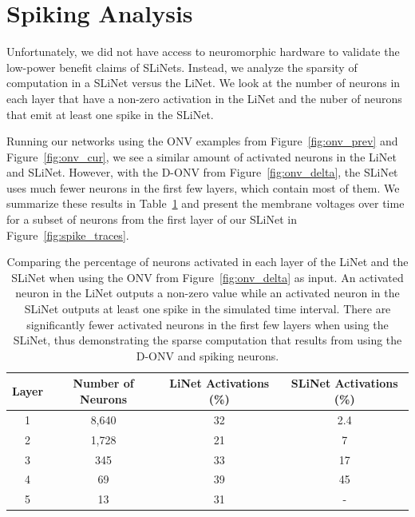 \documentclass [MS] {UCLAthesis}
\begin{document}



\section{Spiking Analysis}

Unfortunately, we did not have access to neuromorphic hardware to validate the low-power benefit claims of SLiNets. Instead, we analyze the sparsity of computation in a SLiNet versus the LiNet. We look at the number of neurons in each layer that have a non-zero activation in the LiNet and the nuber of neurons that emit at least one spike in the SLiNet. 

Running our networks using the ONV examples from Figure~\ref{fig:onv_prev} and Figure~\ref{fig:onv_cur}, we see a similar amount of activated neurons in the LiNet and SLiNet. However, with the D-ONV from Figure~\ref{fig:onv_delta}, the SLiNet uses much fewer neurons in the first few layers, which contain most of them. We summarize these results in Table~\ref{table:onv_delta} and present the membrane voltages over time for a subset of neurons from the first layer of our SLiNet in Figure~\ref{fig:spike_traces}.


\begin{table}
    \centering
    \begin{tabular}{c c c c} 
        \toprule
        Layer & Number of Neurons & LiNet Activations (\%) & SLiNet Activations (\%)\\ 
        \midrule
        1 & 8,640 & 32 & 2.4 \\ 
        
        2 & 1,728 & 21 & 7 \\
        
        3 & 345 & 33 & 17 \\
        
        4 & 69 & 39 & 45 \\
        
        5 & 13 & 31 & - \\ 
        \bottomrule
    \end{tabular}
    \caption[Percentage of neurons activated in the LiNet vs the SLiNet]{Comparing the percentage of neurons activated in each layer of the LiNet and the SLiNet when using the ONV from Figure~\ref{fig:onv_delta} as input. An activated neuron in the LiNet outputs a non-zero value while an activated neuron in the SLiNet outputs at least one spike in the simulated time interval. There are significantly fewer activated neurons in the first few layers when using the SLiNet, thus demonstrating the sparse computation that results from using the D-ONV and spiking neurons.}
    \label{table:onv_delta}
\end{table}
\end{document}
